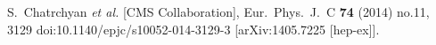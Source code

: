 \documentclass{PoS}
\begin{document}
\begin{thebibliography}{99}
  S.~Chatrchyan {\it et al.} [CMS Collaboration],
  Eur.\ Phys.\ J.\ C {\bf 74} (2014) no.11,  3129
  doi:10.1140/epjc/s10052-014-3129-3
  [arXiv:1405.7225 [hep-ex]].


\end{thebibliography}
\end{document}
